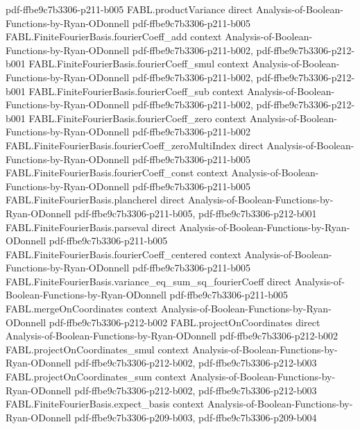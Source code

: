 \begin{theorem}
  {pdf-ffbe9c7b3306-p211-b005}
\proofstep
  {FABL.productVariance}
  {direct}
  {Analysis-of-Boolean-Functions-by-Ryan-ODonnell}
  {pdf-ffbe9c7b3306-p211-b005}
\proofstep
  {FABL.FiniteFourierBasis.fourierCoeff_add}
  {context}
  {Analysis-of-Boolean-Functions-by-Ryan-ODonnell}
  {pdf-ffbe9c7b3306-p211-b002,
    pdf-ffbe9c7b3306-p212-b001}
\proofstep
  {FABL.FiniteFourierBasis.fourierCoeff_smul}
  {context}
  {Analysis-of-Boolean-Functions-by-Ryan-ODonnell}
  {pdf-ffbe9c7b3306-p211-b002,
    pdf-ffbe9c7b3306-p212-b001}
\proofstep
  {FABL.FiniteFourierBasis.fourierCoeff_sub}
  {context}
  {Analysis-of-Boolean-Functions-by-Ryan-ODonnell}
  {pdf-ffbe9c7b3306-p211-b002,
    pdf-ffbe9c7b3306-p212-b001}
\proofstep
  {FABL.FiniteFourierBasis.fourierCoeff_zero}
  {context}
  {Analysis-of-Boolean-Functions-by-Ryan-ODonnell}
  {pdf-ffbe9c7b3306-p211-b002}
\proofstep
  {FABL.FiniteFourierBasis.fourierCoeff_zeroMultiIndex}
  {direct}
  {Analysis-of-Boolean-Functions-by-Ryan-ODonnell}
  {pdf-ffbe9c7b3306-p211-b005}
\proofstep
  {FABL.FiniteFourierBasis.fourierCoeff_const}
  {context}
  {Analysis-of-Boolean-Functions-by-Ryan-ODonnell}
  {pdf-ffbe9c7b3306-p211-b005}
\proofstep
  {FABL.FiniteFourierBasis.plancherel}
  {direct}
  {Analysis-of-Boolean-Functions-by-Ryan-ODonnell}
  {pdf-ffbe9c7b3306-p211-b005,
    pdf-ffbe9c7b3306-p212-b001}
\proofstep
  {FABL.FiniteFourierBasis.parseval}
  {direct}
  {Analysis-of-Boolean-Functions-by-Ryan-ODonnell}
  {pdf-ffbe9c7b3306-p211-b005}
\proofstep
  {FABL.FiniteFourierBasis.fourierCoeff_centered}
  {context}
  {Analysis-of-Boolean-Functions-by-Ryan-ODonnell}
  {pdf-ffbe9c7b3306-p211-b005}
\proofstep
  {FABL.FiniteFourierBasis.variance_eq_sum_sq_fourierCoeff}
  {direct}
  {Analysis-of-Boolean-Functions-by-Ryan-ODonnell}
  {pdf-ffbe9c7b3306-p211-b005}
\proofstep
  {FABL.mergeOnCoordinates}
  {context}
  {Analysis-of-Boolean-Functions-by-Ryan-ODonnell}
  {pdf-ffbe9c7b3306-p212-b002}
\proofstep
  {FABL.projectOnCoordinates}
  {direct}
  {Analysis-of-Boolean-Functions-by-Ryan-ODonnell}
  {pdf-ffbe9c7b3306-p212-b002}
\proofstep
  {FABL.projectOnCoordinates_smul}
  {context}
  {Analysis-of-Boolean-Functions-by-Ryan-ODonnell}
  {pdf-ffbe9c7b3306-p212-b002,
    pdf-ffbe9c7b3306-p212-b003}
\proofstep
  {FABL.projectOnCoordinates_sum}
  {context}
  {Analysis-of-Boolean-Functions-by-Ryan-ODonnell}
  {pdf-ffbe9c7b3306-p212-b002,
    pdf-ffbe9c7b3306-p212-b003}
\proofstep
  {FABL.FiniteFourierBasis.expect_basis}
  {context}
  {Analysis-of-Boolean-Functions-by-Ryan-ODonnell}
  {pdf-ffbe9c7b3306-p209-b003,
    pdf-ffbe9c7b3306-p209-b004}
\proofstep

\end{theorem}
